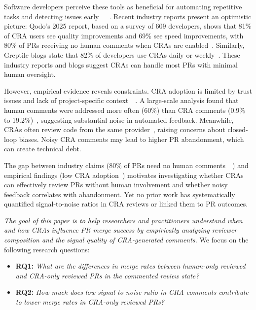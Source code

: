 \documentclass[sigconf]{acmart}
\begin{document}
Software developers perceive these tools as beneficial for automating repetitive tasks and detecting issues early~\cite{Castaldi_2025}~\cite{CHASE_2025}~\cite{ACRPractice_2024}. Recent industry reports present an optimistic picture: Qodo's 2025 report, based on a survey of 609 developers, shows that 81\% of CRA users see quality improvements and 69\% see speed improvements, with 80\% of PRs receiving no human comments when CRAs are enabled~\cite{QodoReport_2025}. Similarly, Greptile blogs state that 82\% of developers use CRAs daily or weekly~\cite{GreptileReport_2025}. These industry reports and blogs suggest CRAs can handle most PRs with minimal human oversight.

However, empirical evidence reveals constraints. CRA adoption is limited by trust issues and lack of project-specific context~\cite{CHASE_2025}~\cite{LLMReview_2025}. A large-scale analysis found that human comments were addressed more often (60\%) than CRA comments (0.9\% to 19.2\%)~\cite{AICodeChanges_2025}, suggesting substantial noise in automated feedback. Meanwhile, CRAs often review code from the same provider~\cite{Li_2025_SE3}, raising concerns about closed-loop biases. Noisy CRA comments may lead to higher PR abandonment, which can create technical debt.

The gap between industry claims (80\% of PRs need no human comments~\cite{QodoReport_2025}~\cite{GreptileReport_2025}) and empirical findings (low CRA adoption~\cite{AICodeChanges_2025}) motivates investigating whether CRAs can effectively review PRs without human involvement and whether noisy feedback correlates with abandonment. Yet no prior work has systematically quantified signal-to-noise ratios in CRA reviews or linked them to PR outcomes.

\textit{The goal of this paper is to help researchers and practitioners understand when and how CRAs influence PR merge success by empirically analyzing reviewer composition and the signal quality of CRA-generated comments.} We focus on the following research questions:

\begin{itemize}
\item  \textbf{RQ1:} \textit{What are the differences in merge rates between human-only reviewed and CRA-only reviewed PRs in the commented review state?}
\item \textbf{RQ2:} \textit{How much does low signal-to-noise ratio in CRA comments contribute to lower merge rates in CRA-only reviewed PRs?}
\end{itemize}
\end{document}
